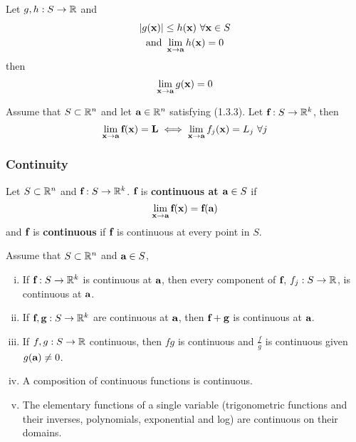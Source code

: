 \documentclass[11pt]{article}
\newcommand{\vex}[0]{\ve{x}}
\newcommand{\vea}[0]{\ve{a}}
\newcommand{\vef}[0]{\ve{f}}
\newcommand{\veg}[0]{\ve{g}}
\begin{document}
			\begin{corollary}
				Let $g, h: S \to \mathbb{R}$ and
				\begin{gather}
					|g(\ve{x})| \leq h(\ve{x})\ \forall \ve{x} \in S \\
					\tx{and } \lim_{\vex \to \vea} h(\vex) = 0
				\end{gather}
				then 
				\begin{gather}
					\lim_{\vex \to \ve{a}} g(\vex) = 0
				\end{gather}
			\end{corollary}
			
			\begin{theorem}
				Assume that $S \subset \mathbb{R}^n$ and let $\vea \in \R^n$ satisfying (1.3.3). Let $\vef: S \to \R^k$, then
				\begin{equation}
					\lim_{\vex \to \vea} \vef(\vex) = \ve{L} \iff \lim_{\vex \to \vea} f_j(\vex) = L_j\ \forall j
				\end{equation}
			\end{theorem}
			
			\subsubsection{Continuity}
				\begin{definition}
					Let $S \subset \mathbb{R}^n$ and $\vef: S \to \R^k$. $\vef$ is \textbf{continuous at $\vea \in S$} if 
					\begin{equation}
						\lim_{\vex \to \vea}\vef(\vex) = \vef(\vea)
					\end{equation}
					and $\vef$ is \textbf{continuous} if $\vef$ is continuous at every point in $S$.
				\end{definition}
			
				\begin{theorem}
					Assume that $S \subset \mathbb{R}^n$ and $\vea \in S$,
					\begin{enumerate}[(i)]
						\item If $\vef: S \to \R^k$ is continuous at $\vea$, then every component of $\vef$, $f_j: S \to \mathbb{R}$, is continuous at $\vea$.
						\item If $\vef, \veg: S \to \R^k$ are continuous at $\vea$, then $\vef + \veg$ is continuous at $\vea$.
						\item If $f, g: S \to \mathbb{R}$ continuous, then $fg$ is continuous and $\frac{f}{g}$ is continuous given $g(\vea) \neq 0$.
						\item A composition of continuous functions is continuous.
						\item The elementary functions of a single variable (trigonometric functions and their inverses, polynomials, exponential and log) are continuous on their domains.
					\end{enumerate}
				\end{theorem}
\end{document}

